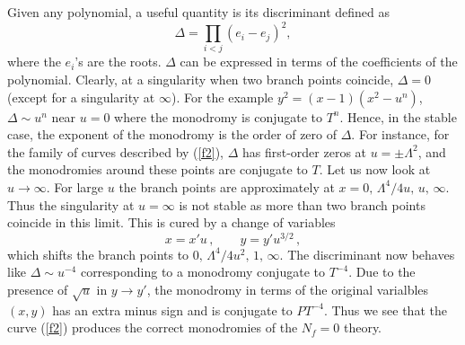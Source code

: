 


Given any polynomial, a useful quantity is its discriminant defined as
$$
\Delta = \prod_{i<j} (e_i - e_j)^2,
$$
where the $e_i$'s are the roots.  $\Delta$ can be expressed in terms of
the coefficients of the polynomial. Clearly, at a singularity when two
branch points coincide, $\Delta = 0$ (except for a singularity at
$\infty$). For the example $y^2 = (x-1)(x^2-u^n)$, $\Delta \sim u^n$
near $u = 0$ where the monodromy is conjugate to $T^n$. Hence, in the
stable case, the exponent of the monodromy is the order of zero of
$\Delta$. For instance, for the family of curves described by
(\ref{f2}), $\Delta$ has first-order zeros at $u=\pm\Lambda^2$, and
the monodromies around these points are conjugate to $T$. 
Let us now look at $u\rightarrow \infty$. For large $u$ the branch
points are approximately at $x=0,\,\Lambda^4/4u,\,u,\,\infty$. Thus
the singularity at $u=\infty$ is not stable as more than two branch
points coincide in this limit. This is cured by a change of variables 
$$
x = x'u\,, \qquad y = y' u^{3/2}\,,
$$
which shifts the branch points to $0,\,\Lambda^4/4u^2,\,1,\,\infty$.
The discriminant now behaves like $\Delta \sim u^{-4}$ corresponding
to a monodromy conjugate to $T^{-4}$. Due to the presence of $\sqrt u$
in $y \rightarrow y'$, the monodromy in terms of the original
varialbles $(x,y)$ has an extra minus sign and is conjugate to
$PT^{-4}$. Thus we see that the curve (\ref{f2}) produces the correct
monodromies of the $N_f = 0$ theory.

